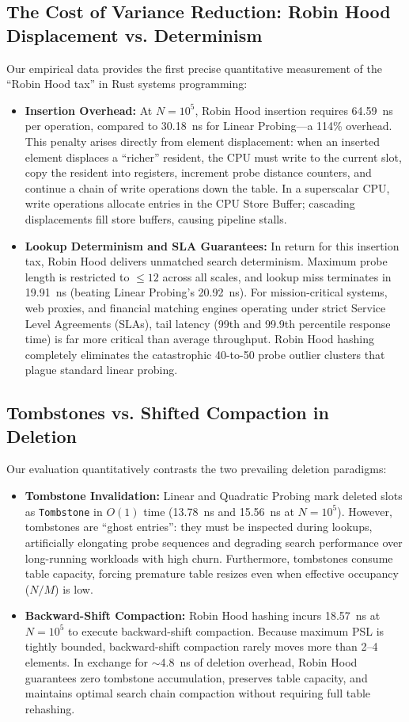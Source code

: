 \documentclass[conference]{IEEEtran}
\begin{document}
\subsection{The Cost of Variance Reduction: Robin Hood Displacement vs. Determinism}

Our empirical data provides the first precise quantitative measurement of the ``Robin Hood tax'' in Rust systems programming:
\begin{itemize}
  \item \textbf{Insertion Overhead:} At $N = 10^5$, Robin Hood insertion requires 64.59~ns per operation, compared to 30.18~ns for Linear Probing---a 114\% overhead. This penalty arises directly from element displacement: when an inserted element displaces a ``richer'' resident, the CPU must write to the current slot, copy the resident into registers, increment probe distance counters, and continue a chain of write operations down the table. In a superscalar CPU, write operations allocate entries in the CPU Store Buffer; cascading displacements fill store buffers, causing pipeline stalls.
  \item \textbf{Lookup Determinism and SLA Guarantees:} In return for this insertion tax, Robin Hood delivers unmatched search determinism. Maximum probe length is restricted to $\le 12$ across all scales, and lookup miss terminates in 19.91~ns (beating Linear Probing's 20.92~ns). For mission-critical systems, web proxies, and financial matching engines operating under strict Service Level Agreements (SLAs), tail latency (99th and 99.9th percentile response time) is far more critical than average throughput. Robin Hood hashing completely eliminates the catastrophic 40-to-50 probe outlier clusters that plague standard linear probing.
\end{itemize}

\subsection{Tombstones vs. Shifted Compaction in Deletion}

Our evaluation quantitatively contrasts the two prevailing deletion paradigms:
\begin{itemize}
  \item \textbf{Tombstone Invalidation:} Linear and Quadratic Probing mark deleted slots as \texttt{Tombstone} in $O(1)$ time (13.78~ns and 15.56~ns at $N = 10^5$). However, tombstones are ``ghost entries'': they must be inspected during lookups, artificially elongating probe sequences and degrading search performance over long-running workloads with high churn. Furthermore, tombstones consume table capacity, forcing premature table resizes even when effective occupancy ($N / M$) is low.
  \item \textbf{Backward-Shift Compaction:} Robin Hood hashing incurs 18.57~ns at $N = 10^5$ to execute backward-shift compaction. Because maximum PSL is tightly bounded, backward-shift compaction rarely moves more than 2--4 elements. In exchange for $\sim$4.8~ns of deletion overhead, Robin Hood guarantees zero tombstone accumulation, preserves table capacity, and maintains optimal search chain compaction without requiring full table rehashing.
\end{itemize}
\end{document}
